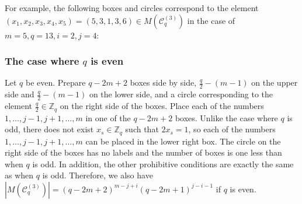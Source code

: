 \documentclass{article}
\theoremstyle{plain}
\theoremstyle{definition}
\theoremstyle{remark}
\numberwithin{equation}{section}
\newcommand{\Cc}{\mathcal{C}}
\begin{document}
For example, the following boxes and circles correspond to the element $(x_1,x_2,x_3,x_4,x_5)=(5,3,1,3,6)\in M(\Cc^{(3)}_q)$ in the case of $m=5,q=13,i=2,j=4$:
\begin{center}
\end{center}

\subsubsection{The case where $q$ is even}\label{sec-TypeC-rest-x_i=x_j-even}
Let $q$ be even.
Prepare $q-2m+2$ boxes side by side, $\displaystyle \frac{q}{2}-(m-1)$ on the upper side and $\displaystyle \frac{q}{2}-(m-1)$ on the lower side, and a circle corresponding to the element $\displaystyle \frac{q}{2}\in\mathbb{Z}_q$ on the right side of the boxes.
Place each of the numbers $1,\dots,j-1,j+1,\dots,m$ in one of the $q-2m+2$ boxes.
Unlike the case where $q$ is odd, there does not exist $x_s\in\mathbb{Z}_q$ such that $2x_s=1$, so each of the numbers $1,\dots,j-1,j+1,\dots,m$ can be placed in the lower right box.
The circle on the right side of the boxes has no labels and the number of boxes is one less than when $q$ is odd. 
In addition, the other prohibitive conditions are exactly the same as when $q$ is odd.
Therefore, we also have $|M(\Cc^{(3)}_q)|=(q-2m+2)^{m-j+i}(q-2m+1)^{j-i-1}$ if $q$ is even.
\end{document}

